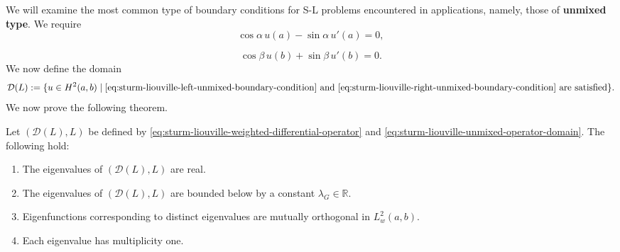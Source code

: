 We will examine the most common type of boundary conditions for S-L problems encountered in applications, namely, those of \textbf{unmixed type}. We require
\begin{equation}\label{eq:sturm-liouville-left-unmixed-boundary-condition}
\cos\alpha\,u(a)-\sin\alpha\,u'(a)=0,
\end{equation}

\begin{equation}\label{eq:sturm-liouville-right-unmixed-boundary-condition}
\cos\beta\,u(b)+\sin\beta\,u'(b)=0.
\end{equation}
We now define the domain
\begin{equation}\label{eq:sturm-liouville-unmixed-operator-domain}
\mathcal{D}(L):=\{u\in H^2(a,b)\mid\eqref{eq:sturm-liouville-left-unmixed-boundary-condition}\text{ and }\eqref{eq:sturm-liouville-right-unmixed-boundary-condition}\text{ are satisfied}\}.
\end{equation}
We now prove the following theorem.

\begin{Theorem}
\label{thm:regular-sturm-liouville-first-spectral-properties}
Let $(\mathcal{D}(L),L)$ be defined by \eqref{eq:sturm-liouville-weighted-differential-operator} and \eqref{eq:sturm-liouville-unmixed-operator-domain}. The following hold:\begin{enumerate}\item The eigenvalues of $(\mathcal{D}(L),L)$ are real.\item The eigenvalues of $(\mathcal{D}(L),L)$ are bounded below by a constant $\lambda_G\in\mathbb{R}$.\item Eigenfunctions corresponding to distinct eigenvalues are mutually orthogonal in $L_w^2(a,b)$.\item Each eigenvalue has multiplicity one.\end{enumerate}
\end{Theorem}

